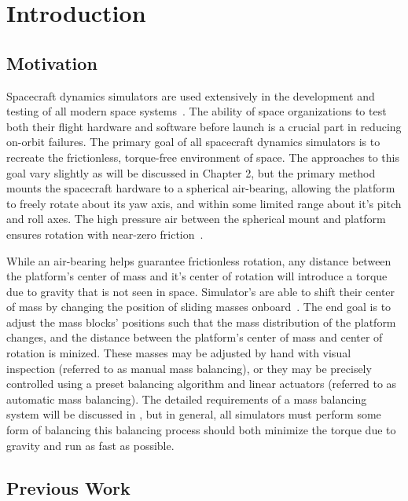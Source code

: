 \chapter{Introduction}

\section{Motivation}
Spacecraft dynamics simulators are used extensively in the development and testing of all modern space systems~\cite{schwartz_historical_2003}. The ability of space organizations to test both their flight hardware and software before launch is a crucial part in reducing on-orbit
failures. The primary goal of all spacecraft dynamics simulators is to recreate the frictionless, torque-free environment of space. The approaches to this goal vary slightly as will be discussed in Chapter 2, but the primary method mounts the spacecraft hardware to a spherical air-bearing, allowing the platform to freely rotate about its yaw axis, and within some limited range about it's pitch and roll axes. The high pressure air between the spherical mount and platform ensures rotation with near-zero friction~\cite{huang_characterizing_2022}.

While an air-bearing helps guarantee frictionless rotation, any distance between the platform's center of mass and it's center of rotation will introduce a torque due to gravity that is not seen in space. Simulator's are able to shift their center of mass by changing the position of sliding masses onboard~\cite{kim_automatic_2009}. The end goal is to adjust the mass blocks' positions such that the mass distribution of the platform changes, and the distance between the platform's center of mass and center of rotation is minized. These masses may be adjusted by hand with visual inspection (referred to as manual mass balancing), or they may be precisely controlled using a preset balancing algorithm and linear actuators (referred to as automatic mass balancing). The detailed requirements of a mass balancing system will be discussed in , but in general, all simulators must perform some form of balancing this balancing process should both minimize the torque due to gravity and run as fast as possible.



\section{Previous Work}

